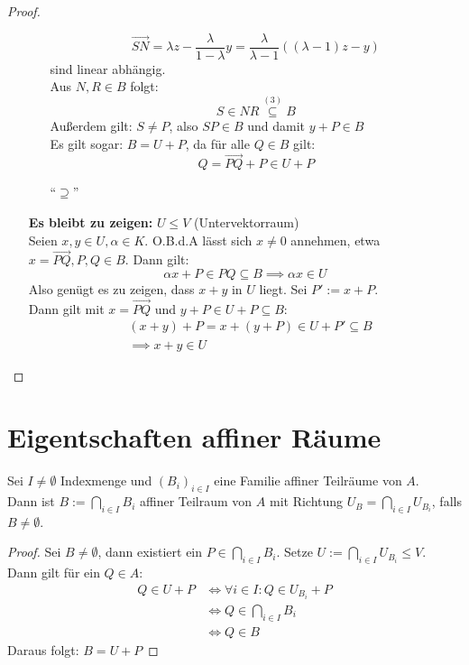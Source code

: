 \documentclass[parskip,a4paper,twoside,DIV15,BCOR12mm]{scrbook}
\begin{document}
\begin{proof}
\begin{itemize}
\begin{enumerate}
\[\overrightarrow{SN} = \lambda z-\frac{\lambda}{1-\lambda}y=\frac{\lambda}{\lambda-1}
((\lambda-1)z-y)\]
sind linear abhängig.\\
Aus $N,R\in B$ folgt:
\[S\in NR \stackrel{(3)}{\subseteq}B\]
Außerdem gilt: $S\ne P$, also $SP\in B$ und damit $y+P\in B$\\
Es gilt sogar: $B=U+P$, da für alle $Q\in B$ gilt:
\[Q=\overrightarrow{PQ}+P\in U+P\]
\item["`$\supseteq$"'] \checkmark
\end{enumerate}
\textbf{Es bleibt zu zeigen:} $U\le V$ (Untervektorraum)\\
Seien $x,y\in U,\alpha\in K$. O.B.d.A lässt sich $x\ne 0$ annehmen, etwa $x=\overrightarrow{PQ},
P,Q\in B$. Dann gilt:\\
\[\alpha x+P\in PQ \subseteq B \implies \alpha x\in U\]
Also genügt es zu zeigen, dass $x+y$ in $U$ liegt. Sei $P':=x+P$.\\
Dann gilt mit $x=\overrightarrow{PQ}$ und $y+P\in U+P\subseteq B$:\\
\begin{align*}
&(x+y)+P=x+(y+P)\in U+P'\subseteq B\\
&\implies x+y\in U
\end{align*}
\end{itemize}
\end{proof}

\section{Eigentschaften affiner Räume}
\begin{lemma}
Sei $I\ne\emptyset$ Indexmenge und $(B_i)_{i\in I}$ eine Familie affiner Teilräume von $A$.\\
Dann ist $B:= \bigcap_{i\in I} B_i$ affiner Teilraum von $A$ mit Richtung
$U_B=\bigcap_{i\in I} U_{B_i}$, falls $B\ne\emptyset$.
\end{lemma}

\begin{proof}
Sei $B\ne\emptyset$, dann existiert ein $P\in\bigcap_{i\in I}B_i$.
Setze $U:=\bigcap_{i\in I}U_{B_i} \le V$.\\
Dann gilt für ein $Q\in A$:\\
\begin{align*}
Q\in U+P &\iff \forall i\in I: Q\in U_{B_i}+P\\
&\iff Q\in\bigcap_{i\in I}B_i\\
&\iff Q\in B
\end{align*}
Daraus folgt: $B=U+P$
\end{proof}
\end{document}
